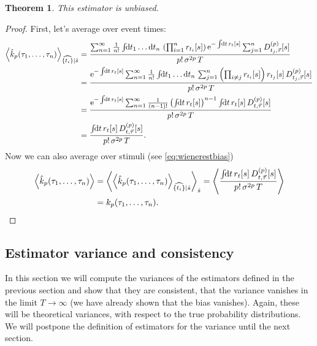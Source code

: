 \documentclass[12pt]{article}
\theoremstyle{slplain}
\newtheorem{thm}{Theorem}
\theoremstyle{sldefinition}
\theoremstyle{remark}
\begin{document}
\begin{thm}
  This estimator is unbiased.
\end{thm}
\begin{proof}
  First, let's average over event times:
  \begin{equation*}
    \begin{aligned}
      \av{\hat{k}_p(\tau_1,\ldots,\tau_n)}_{\widehat{\{t_i\}}|\hat{s}}  &=
        \frac{\sum_{n=1}^\infty  \frac{1}{n!} \intd{t_1\ldots\dr t_n} \prn{\prod_{i=1}^n r_{t_i}[s]} \e^{-\intd{t}r_t[s]} \sum_{j=1}^n D\rp{p}_{t_j,\vec{\tau}}[s] }{ p! \, \sigma^{2p} \, T } \\
        &= \frac{\e^{-\intd{t}r_t[s]} \sum_{n=1}^\infty  \frac{1}{n!} \intd{t_1\ldots\dr t_n} \sum_{j=1}^n \prn{\prod_{i\neq j} r_{t_i}[s]} r_{t_j}[s] \, D\rp{p}_{t_j,\vec{\tau}}[s] }{ p! \, \sigma^{2p} \, T } \\
        &= \frac{\e^{-\intd{t}r_t[s]} \sum_{n=1}^\infty  \frac{1}{(n-1)!}  \prn{\intd{t} r_{t}[s]}^{n-1} \intd{t} r_{t}[s] \, D\rp{p}_{t,\vec{\tau}}[s] }{ p! \, \sigma^{2p} \, T } \\
        &= \frac{ \intd{t} r_{t}[s] \, D\rp{p}_{t,\vec{\tau}}[s] }{ p! \, \sigma^{2p} \, T } .
    \end{aligned}
  \end{equation*}
  Now we can also average over stimuli (see \eqref{eq:wienerestbias})
  \begin{equation*}
    \begin{aligned}
      \av{\hat{k}_p(\tau_1,\ldots,\tau_n)}  &=
        \av{ \av{\hat{k}_p(\tau_1,\ldots,\tau_n)}_{\widehat{\{t_i\}}|\hat{s}} }_{\hat{s}}
        = \av{ \frac{ \intd{t} r_{t}[s] \, D\rp{p}_{t,\vec{\tau}}[s] }{ p! \, \sigma^{2p} \, T } } \\
        &=  %
        k_p(\tau_1,\ldots,\tau_n).
    \end{aligned}
  \end{equation*}
\end{proof}


\subsection{Estimator variance and consistency}\label{sec:poissonvar}

In this section we will compute the variances of the estimators defined in the previous section and show that they are consistent, \ie that the variance vanishes in the limit $T\to\infty$ (we have already shown that the bias vanishes). Again, these will be theoretical variances, with respect to the true probability distributions. We will postpone the definition of estimators for the variance until the next section.
\end{document}
